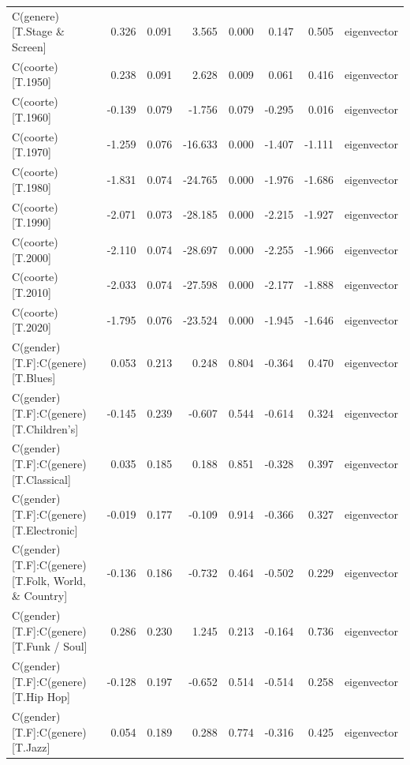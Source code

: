 \begin{table}
\begin{tabular}{lrrrrrrl}
                       C(genere)[T.Stage \& Screen] &  0.326 & 0.091 &   3.565 & 0.000 &  0.147 &  0.505 & eigenvector \\
                                 C(coorte)[T.1950] &  0.238 & 0.091 &   2.628 & 0.009 &  0.061 &  0.416 & eigenvector \\
                                 C(coorte)[T.1960] & -0.139 & 0.079 &  -1.756 & 0.079 & -0.295 &  0.016 & eigenvector \\
                                 C(coorte)[T.1970] & -1.259 & 0.076 & -16.633 & 0.000 & -1.407 & -1.111 & eigenvector \\
                                 C(coorte)[T.1980] & -1.831 & 0.074 & -24.765 & 0.000 & -1.976 & -1.686 & eigenvector \\
                                 C(coorte)[T.1990] & -2.071 & 0.073 & -28.185 & 0.000 & -2.215 & -1.927 & eigenvector \\
                                 C(coorte)[T.2000] & -2.110 & 0.074 & -28.697 & 0.000 & -2.255 & -1.966 & eigenvector \\
                                 C(coorte)[T.2010] & -2.033 & 0.074 & -27.598 & 0.000 & -2.177 & -1.888 & eigenvector \\
                                 C(coorte)[T.2020] & -1.795 & 0.076 & -23.524 & 0.000 & -1.945 & -1.646 & eigenvector \\
                 C(gender)[T.F]:C(genere)[T.Blues] &  0.053 & 0.213 &   0.248 & 0.804 & -0.364 &  0.470 & eigenvector \\
            C(gender)[T.F]:C(genere)[T.Children's] & -0.145 & 0.239 &  -0.607 & 0.544 & -0.614 &  0.324 & eigenvector \\
             C(gender)[T.F]:C(genere)[T.Classical] &  0.035 & 0.185 &   0.188 & 0.851 & -0.328 &  0.397 & eigenvector \\
            C(gender)[T.F]:C(genere)[T.Electronic] & -0.019 & 0.177 &  -0.109 & 0.914 & -0.366 &  0.327 & eigenvector \\
C(gender)[T.F]:C(genere)[T.Folk, World, \& Country] & -0.136 & 0.186 &  -0.732 & 0.464 & -0.502 &  0.229 & eigenvector \\
           C(gender)[T.F]:C(genere)[T.Funk / Soul] &  0.286 & 0.230 &   1.245 & 0.213 & -0.164 &  0.736 & eigenvector \\
               C(gender)[T.F]:C(genere)[T.Hip Hop] & -0.128 & 0.197 &  -0.652 & 0.514 & -0.514 &  0.258 & eigenvector \\
                  C(gender)[T.F]:C(genere)[T.Jazz] &  0.054 & 0.189 &   0.288 & 0.774 & -0.316 &  0.425 & eigenvector \\

\end{tabular}
\end{table}
